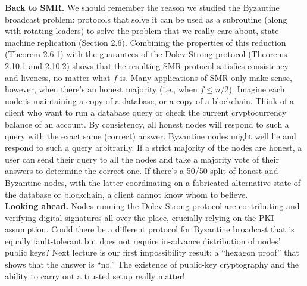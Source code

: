 \noindent
\textbf{Back to SMR.} We should remember the reason we studied the Byzantine broadcast problem: protocols that solve it can be used as a subroutine (along with rotating leaders) to solve the problem that we really care about, state machine replication (Section 2.6). Combining the
properties of this reduction (Theorem 2.6.1) with the guarantees of the Dolev-Strong protocol
(Theorems 2.10.1 and 2.10.2) shows that the resulting SMR protocol satisfies consistency and
liveness, no matter what $f$ is.
Many applications of SMR only make sense, however, when there’s an honest majority
(i.e., when $f \leq n/2$). Imagine each node is maintaining a copy of a database, or a copy
of a blockchain. Think of a client who want to run a database query or check the current
cryptocurrency balance of an account. By consistency, all honest nodes will respond to such
a query with the exact same (correct) answer. Byzantine nodes might well lie and respond
to such a query arbitrarily. If a strict majority of the nodes are honest, a user can send their
query to all the nodes and take a majority vote of their answers to determine the correct one. If there’s a 50/50 split of honest and Byzantine nodes, with the latter coordinating on
a fabricated alternative state of the database or blockchain, a client cannot know whom to
believe.\\

\noindent
\textbf{Looking ahead.} Nodes running the Dolev-Strong protocol are contributing and verifying
digital signatures all over the place, crucially relying on the PKI assumption. Could there
be a different protocol for Byzantine broadcast that is equally fault-tolerant but does not
require in-advance distribution of nodes’ public keys? Next lecture is our first impossibility
result: a “hexagon proof” that shows that the answer is “no.” The existence of public-key
cryptography and the ability to carry out a trusted setup really matter!


